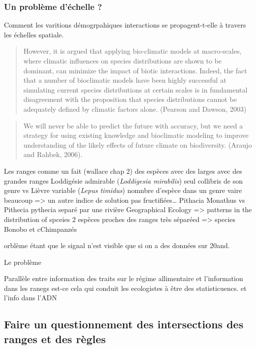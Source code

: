 \subsubsection{Un problème d'échelle
?}\label{un-probluxe8me-duxe9chelle}

Comment les varitions démogrpahiques interactions se propagent-t-elle à
travers les échelles spatiale.

\begin{quote}
However, it is argued that applying bio-climatic models at macro-scales,
where climatic influences on species distributions are shown to be
dominant, can minimize the impact of biotic interactions. Indeed, the
fact that a number of bioclimatic models have been highly successful at
simulating current species distributions at certain scales is in
fundamental disagreement with the proposition that species distributions
cannot be adequately defined by climatic factors alone. (Pearson and
Dawson, 2003)
\end{quote}

\begin{quote}
We will never be able to predict the future with accuracy, but we need a
strategy for using existing knowledge and bioclimatic modeling to
improve understanding of the likely effects of future climate on
biodiversity. (Araujo and Rahbek, 2006).
\end{quote}

Les ranges comme un fait (wallace chap 2) des espèces avec des larges
avec des grandes ranges Loddigésie admirable (\emph{Loddigesia
mirabilis}) seul collibris de son genre vs Lièvre variable (\emph{Lepus
timidus}) nomnbre d'espèce dans un genre vaire beaucoup =\textgreater{}
un autre indice de solution pas fructifiées\ldots{} Pithacia Monathus vs
Pithecia pythecia separé par une rivière Geographical Ecology
=\textgreater{} patterns in the distribution of spceies 2 espèces
proches des ranges très séparéed =\textgreater{} species Bonobo et
cChimpanzés

orblème étant que le signal n'est visible que si on a des données sur
20and.

Le problème

Parallèle entre information des traits sur le régime allimentaire et
l'information dans les ranegs est-ce cela qui conduit les ecologistes à
être des statisticuencs. et l'info dans l'ADN

\subsection{Faire un questionnement des intersections des ranges et des
règles}\label{faire-un-questionnement-des-intersections-des-ranges-et-des-ruxe8gles}

